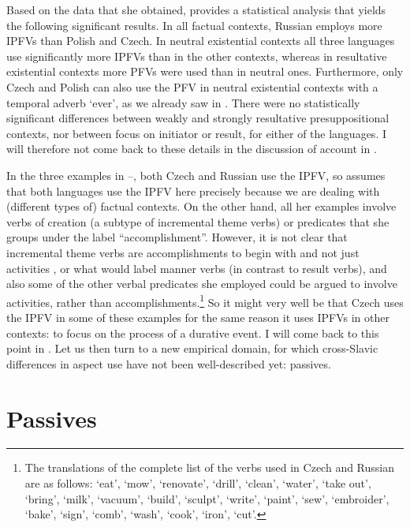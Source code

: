 \documentclass[output=paper,colorlinks,citecolor=brown]{langscibook}
\begin{document}
Based on the data that she obtained, \citet{klimek22} provides a statistical analysis that yields the following significant results. In all factual contexts, Russian employs more IPFVs than Polish and Czech. In neutral existential contexts all three languages use significantly more IPFVs than in the other contexts, whereas in resultative existential contexts more PFVs were used than in neutral ones. Furthermore, only Czech and Polish can also use the PFV in neutral existential contexts with a temporal adverb `ever', as we already saw in . There were no statistically significant differences between weakly and strongly resultative presuppositional contexts, nor between focus on initiator or result, for either of the languages. I will therefore not come back to these details in the discussion of  account in .

In the three examples in --, both Czech and Russian use the IPFV, so \citet{klimek22} assumes that both languages use the IPFV here precisely because we are dealing with (different types of) factual contexts. On the other hand, all her examples involve verbs of creation (a subtype of incremental theme verbs) or predicates that she groups under the label ``accomplishment''. However, it is not clear that incremental theme verbs are accomplishments to begin with and not just activities \citep[see, e.g.,][]{kennedyincr}, or what \citet{rappaportlevin10} would label manner verbs (in contrast to result verbs), and also some of the other verbal predicates she employed could be argued to involve activities, rather than accomplishments.\footnote{The translations of the complete list of the verbs used in Czech and Russian are as follows: `eat', `mow', `renovate', `drill', `clean', `water', `take out', `bring', `milk', `vacuum', `build', `sculpt', `write', `paint', `sew', `embroider', `bake', `sign', `comb', `wash', `cook', `iron', `cut'.} So it might very well be that Czech uses the IPFV in some of these examples for the same reason it uses IPFVs in other contexts: to focus on the process of a durative event. I will come back to this point in %
. Let us then turn to a new empirical domain, for which cross-Slavic differences in aspect use have not been well-described yet: passives. 

\section{Passives}
\label{sec:passives}
\end{document}
